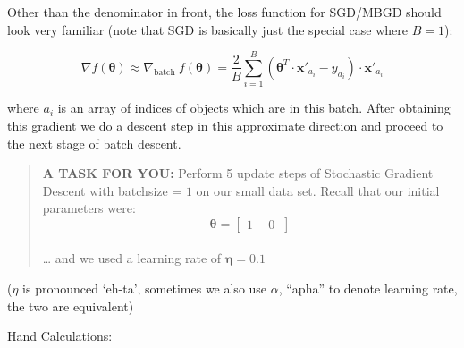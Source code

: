 \documentclass[11pt]{article}
\begin{document}
Other than the denominator in front, the loss function for SGD/MBGD
should look very familiar (note that SGD is basically just the special
case where \(B = 1\)):

\begin{equation}\tag{3.2}
\nabla f(\boldsymbol{\theta}) \approx \nabla_{\text{batch}\,\,} f(\boldsymbol{\theta}) = \frac{2}{B}\sum_{i=1}^{B}\left(\boldsymbol{\theta}^T \cdot\mathbf{x}'_{a_i} - y_{a_i}\right)\cdot \mathbf{x}'_{a_i}
\end{equation}

where \(a_i\) is an array of indices of objects which are in this batch.
After obtaining this gradient we do a descent step in this approximate
direction and proceed to the next stage of batch descent.

\begin{quote}
\textbf{A TASK FOR YOU:} Perform 5 update steps of Stochastic Gradient
Descent with batchsize = \(1\) on our small data set. Recall that our
initial parameters were:
\[ \boldsymbol{\theta} = \begin{bmatrix} 1 \ \quad 0 \ \end{bmatrix}\]\\
\ldots{} and we used a learning rate of \(\boldsymbol{\eta} = 0.1\)
\end{quote}

(\(\eta\) is pronounced `eh-ta', sometimes we also use \(\alpha\),
``apha'' to denote learning rate, the two are equivalent)

Hand Calculations:
\end{document}
